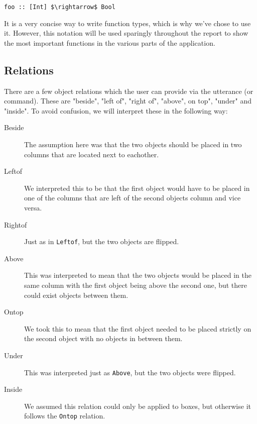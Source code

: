 \begin{lstlisting}
foo :: [Int] $\rightarrow$ Bool
\end{lstlisting}

It is a very concise way to write function types, which is why we've chose to use it. However, this notation will be used sparingly throughout the report to show the most important functions in the various parts of the application.

\subsection*{Relations}
There are a few object relations which the user can provide via the utterance (or command). These are "beside", "left of", "right of", "above", on top", "under" and "inside". To avoid confusion, we will interpret these in the following way:

\begin{description}
  \item[Beside] The assumption here was that the two objects should be placed in
    two columns that are located next to eachother.
  \item[Leftof] We interpreted this to be that the first object would have to be
    placed in one of the columns that are left of the second objects column and
    vice versa.
  \item[Rightof] Just as in \verb|Leftof|, but the two objects are flipped.
  \item[Above] This was interpreted to mean that the two objects would be placed
    in the same column with the first object being above the second one, but
    there could exist objects between them.
  \item[Ontop] We took this to mean that the first object needed to be placed
   strictly on the second object with no objects in between them.
  \item[Under] This was interpreted just as \verb|Above|, but the two objects
    were flipped.
  \item[Inside] We assumed this relation could only be applied to boxes, but
  otherwise it follows the \verb|Ontop| relation.
\end{description}
